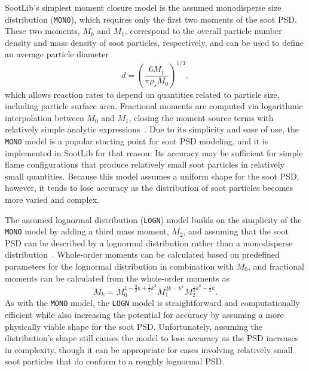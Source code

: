 \documentclass[preprint,letterpaper]{elsarticle}
\begin{document}
SootLib's simplest moment closure model is the assumed monodisperse size distribution (\texttt{MONO}), which requires only the first two moments of the soot PSD. These two moments, $M_0$ and $M_1$, correspond to the overall particle number density and mass density of soot particles, respectively, and can be used to define an average particle diameter
\begin{equation}
    d = \left( \frac{6M_1}{\pi \rho_s M_0} \right)^{1/3},
\end{equation}
which allows reaction rates to depend on quantities related to particle size, including particle surface area. Fractional moments are computed via logarithmic interpolation between $M_0$ and $M_1$, closing the moment source terms with relatively simple analytic expressions~\cite{Lignell_2008b}. Due to its simplicity and ease of use, the \texttt{MONO} model is a popular starting point for soot PSD modeling, and it is implemented in SootLib for that reason. Its accuracy may be sufficient for simple flame configurations that produce relatively small soot particles in relatively small quantities. Because this model assumes a uniform shape for the soot PSD, however, it tends to lose accuracy as the distribution of soot particles becomes more varied and complex.

The assumed lognormal distribution (\texttt{LOGN}) model builds on the simplicity of the \texttt{MONO} model by adding a third mass moment, $M_2$, and assuming that the soot PSD can be described by a lognormal distribution rather than a monodisperse distribution~\cite{Lignell_2008b}. Whole-order moments can be calculated based on predefined parameters for the lognormal distribution in combination with $M_0$, and fractional moments can be calculated from the whole-order moments as
\begin{equation}
    M_k = M_0^{1-\frac{3}{2}k+\frac{1}{2}k^2} M_1^{2k-k^2} M_2^{\frac{1}{2}k^2-\frac{1}{2}k}.
\end{equation}
As with the \texttt{MONO} model, the \texttt{LOGN} model is straightforward and computationally efficient while also increasing the potential for accuracy by assuming a more physically viable shape for the soot PSD. Unfortunately, assuming the distribution's shape still causes the model to lose accuracy as the PSD increases in complexity, though it can be appropriate for cases involving relatively small soot particles that do conform to a roughly lognormal PSD.
\end{document}
